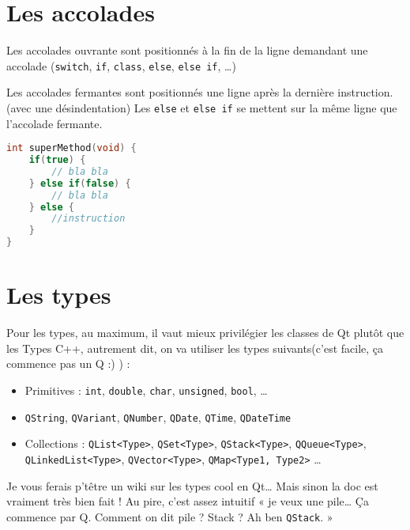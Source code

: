 \section{Les accolades}\label{les-accolades}

Les accolades ouvrante sont positionnés à la fin de la ligne demandant
une accolade (\texttt{switch}, \texttt{if}, \texttt{class}, \texttt{else}, \texttt{else if}, \ldots{})

Les accolades fermantes sont positionnés une ligne après la dernière
instruction. (avec une désindentation) Les \texttt{else} et \texttt{else if} se mettent sur la 
même ligne que l'accolade fermante.


\begin{lstlisting}[language=C++]
int superMethod(void) {     
	if(true) {
		// bla bla     
	} else if(false) {
		// bla bla      
	} else { 
		//instruction 
	}
}
\end{lstlisting}

\section{Les types}\label{les-types}

Pour les types, au maximum, il vaut mieux privilégier les classes de Qt
plutôt que les Types C++, autrement dit, on va utiliser les types
suivants(c'est facile, ça commence pas un Q :) ) :

\begin{itemize}
\itemsep1pt\parskip0pt
\item
  Primitives : \texttt{int}, \texttt{double}, \texttt{char},
  \texttt{unsigned}, \texttt{bool}, \ldots{}
\item
  \texttt{QString}, \texttt{QVariant}, \texttt{QNumber}, \texttt{QDate},
  \texttt{QTime}, \texttt{QDateTime}
\item
  Collections : \texttt{QList\textless{}Type\textgreater{}},
  \texttt{QSet\textless{}Type\textgreater{}},
  \texttt{QStack\textless{}Type\textgreater{}},
  \texttt{QQueue\textless{}Type\textgreater{}},
  \texttt{QLinkedList\textless{}Type\textgreater{}},
  \texttt{QVector\textless{}Type\textgreater{}},
  \texttt{QMap\textless{}Type1, Type2\textgreater{}} \ldots{}
\end{itemize}

Je vous ferais p'têtre un wiki sur les types cool en Qt\ldots{} Mais
sinon la doc est vraiment très bien fait ! Au pire, c'est assez intuitif
« je veux une pile\ldots{} Ça commence par Q. Comment on dit pile ?
Stack ? Ah ben \texttt{QStack}. »

